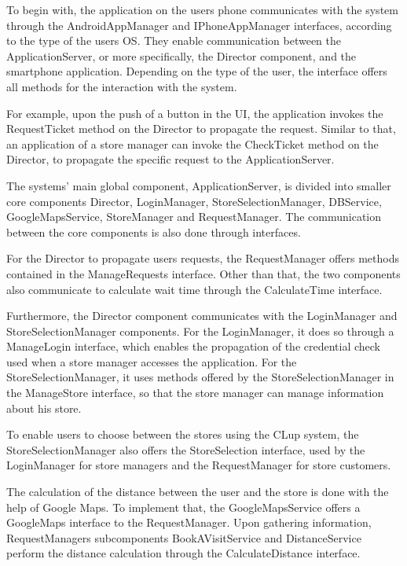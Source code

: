 To begin with, the application on the users phone communicates with the system through the AndroidAppManager and IPhoneAppManager interfaces, according to the type of the users OS. They enable communication between the ApplicationServer, or more specifically, the Director component, and the smartphone application. Depending on the type of the user, the interface offers all methods for the interaction with the system. 

For example, upon the push of a button in the UI, the application invokes the RequestTicket method on the Director to propagate the request. Similar to that, an application of a store manager can invoke the CheckTicket method on the Director, to propagate the specific request to the ApplicationServer. \newline
 

The systems' main global component, ApplicationServer, is divided into smaller core components Director, LoginManager, StoreSelectionManager, DBService, GoogleMapsService, StoreManager and RequestManager. The communication between the core components is also done through interfaces. 

For the Director to propagate users requests, the RequestManager offers methods contained in the ManageRequests interface. Other than that, the two components also communicate to calculate wait time through the CalculateTime interface. 

Furthermore, the Director component communicates with the LoginManager and StoreSelectionManager components. For the LoginManager, it does so through a ManageLogin interface, which enables the propagation of the credential check used when a store manager accesses the application. For the StoreSelectionManager, it uses methods offered by the StoreSelectionManager in the ManageStore interface, so that the store manager can manage information about his store.  \newline

To enable users to choose between the stores using the CLup system, the StoreSelectionManager also offers the StoreSelection interface, used by the LoginManager for store managers and the RequestManager for store customers. 

The calculation of the distance between the user and the store is done with the help of Google Maps. To implement that, the GoogleMapsService offers a GoogleMaps interface to the RequestManager. Upon gathering information, RequestManagers subcomponents BookAVisitService and DistanceService perform the distance calculation through the CalculateDistance interface. \newline

